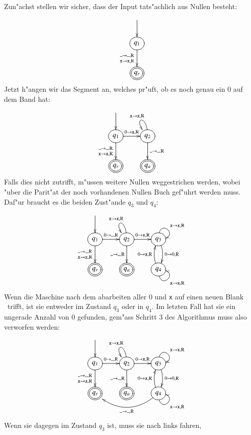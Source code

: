 Zun"achst stellen wir sicher, dass der Input tats"achlich aus Nullen
besteht:
\[
\entrymodifiers={++[o][F]}
\xymatrix{
*+\txt{}\ar[d]
\\
{q_1}\ar[d]_{\genfrac{}{}{0pt}{1}{\blank\to\blank,\text{R}}{{\tt x}\to{\tt x},\text{R}}}
\\
*++[o][F=]{q_r}
}
\]
Jetzt h"angen wir das Segment an, welches pr"uft, ob es noch genau ein $0$
auf dem Band hat:
\[
\entrymodifiers={++[o][F]}
\xymatrix{
*+\txt{}\ar[d]
\\
{q_1}\ar[d]_{\genfrac{}{}{0pt}{1}{\blank\to\blank,\text{R}}{{\tt x}\to{\tt x},\text{R}}}
	\ar[r]^{0\to{\tt x},\text{R}}
	&{q_2}\ar[d]^{\blank\to\blank,\text{R}}
              \ar@(u,ul)_{{\tt x}\to {\tt x},\text{R}}
\\
*++[o][F=]{q_r}
	&*++[o][F=]{q_a}
}
\]
Falls dies nicht zutrifft, m"ussen weitere Nullen weggestrichen werden,
wobei "uber die Parit"at der noch vorhandenen Nullen Buch gef"uhrt werden
muss. Daf"ur braucht es die beiden Zust"ande $q_3$ und $q_4$:
\[
\entrymodifiers={++[o][F]}
\xymatrix{
*+\txt{}\ar[d]
\\
{q_1}\ar[d]_{\genfrac{}{}{0pt}{1}{\blank\to\blank,\text{R}}{{\tt x}\to{\tt x},\text{R}}}
	\ar[r]^{0\to\blank,\text{R}}
	&{q_2}\ar[d]_{\blank\to\blank,\text{R}}
	      \ar[r]^{0\to{\tt x},\text{R}}
              \ar@(u,ul)_{{\tt x}\to {\tt x},\text{R}}
		&{q_3}\ar@(u,r)^{{\tt x}\to{\tt x},\text{R}}
		      \ar@/^/[d]^{0\to 0,\text{R}}
\\
*++[o][F=]{q_r}
	&*++[o][F=]{q_a}
		&{q_4}\ar@/^/[u]^{0\to {\tt x},\text{R}}
		      \ar@(d,r)_{{\tt x}\to{\tt x},\text{R}}
}
\]
Wenn die Maschine nach dem abarbeiten aller 0 und {\tt x} auf einen
neuen Blank \textvisiblespace\ trifft, ist sie entweder im Zustand
$q_3$ oder in $q_4$. Im letzten Fall hat sie ein ungerade Anzahl 
von 0 gefunden, gem"ass Schritt 3 des Algorithmus muss also verworfen
werden:
\[
\entrymodifiers={++[o][F]}
\xymatrix{
*+\txt{}\ar[d]
\\
{q_1}\ar[d]_{\genfrac{}{}{0pt}{1}{\blank\to\blank,\text{R}}{{\tt x}\to{\tt x},\text{R}}}
	\ar[r]^{0\to\blank,\text{R}}
	&{q_2}\ar[d]_{\blank\to\blank,\text{R}}
	      \ar[r]^{0\to{\tt x},\text{R}}
              \ar@(u,ul)_{{\tt x}\to {\tt x},\text{R}}
		&{q_3}\ar@(u,r)^{{\tt x}\to{\tt x},\text{R}}
		      \ar@/^/[d]^{0\to 0,\text{R}}
\\
*++[o][F=]{q_r}
	&*++[o][F=]{q_a}
		&{q_4}\ar@/^/[u]^{0\to {\tt x},\text{R}}
		      \ar@(d,r)_{{\tt x}\to{\tt x},\text{R}}
		      \ar@/^20pt/[ll]^{\blank\to\blank,\text{R}}
}
\]
Wenn sie dagegen im Zustand $q_3$ ist, muss sie nach links fahren,
